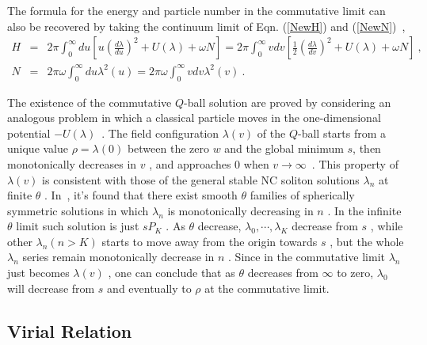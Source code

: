 \documentclass[a4paper,a4paper]{article}
\begin{document}
The formula for the energy and particle number in the commutative
limit can also be recovered by taking the continuum limit of
Eqn. (\ref{NewH}) and (\ref{NewN})\ ,
\begin{eqnarray}
  H&=&2\pi\int_0^\infty du \left[u(\frac
  {d\lambda}{du})^2+U(\lambda)+\omega N\right]= 2\pi\int_0^\infty vdv\left[\frac 12(\frac
  {d\lambda}{dv})^2+U(\lambda)+\omega N\right]\ ,\\ 
  N&=&2\pi\omega\int_0^\infty du\lambda^2(u)=2\pi\omega\int_0^\infty vdv\lambda^2(v)\ .
\end{eqnarray}

The existence of the commutative $Q$-ball solution are
proved by considering an analogous problem in which a classical
particle moves in the one-dimensional potential
$-U(\lambda)$~\cite{Coleman}.  The field configuration $\lambda(v)$ of
the $Q$-ball starts from a unique value $\rho=\lambda(0)$ between the 
zero $w$ and the global minimum $s$, then monotonically decreases in $v$ , 
and approaches $0$ when $v\rightarrow \infty$\ . This property of
$\lambda(v)$ is consistent with those of the general stable NC 
soliton solutions $\lambda_n$ at finite $\theta$ . In~\cite{Dur}, it's 
found that there exist smooth $\theta$ families of spherically
symmetric solutions in which $\lambda_n$ is monotonically decreasing
in $n$ . In the infinite $\theta$ limit such solution is just
$sP_K$ . As $\theta$ decrease, $\lambda_0,\cdots,\lambda_K$
decrease from $s$ , while other $\lambda_n(n>K)$ starts to move away
from the origin towards $s$ , but the whole $\lambda_n$ series remain
monotonically decrease in $n$ . Since in the commutative limit $\lambda_n$ just 
becomes $\lambda(v)$ , one can conclude that as $\theta$ decreases from $\infty$ to
zero, $\lambda_0$ will decrease from $s$ and eventually to $\rho$ at the 
commutative limit. 

\subsection{Virial Relation}
\end{document}
